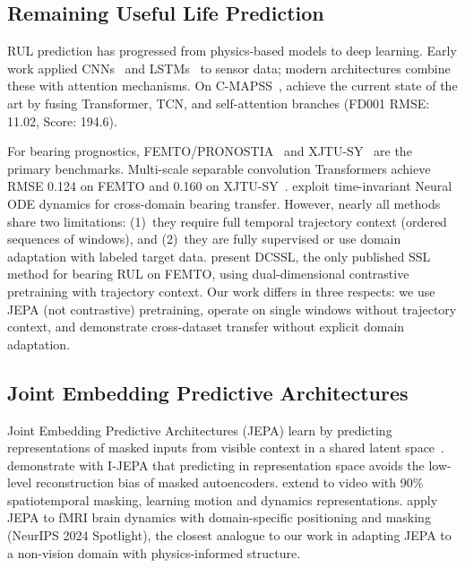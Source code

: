 \subsection{Remaining Useful Life Prediction}
\label{sec:related_rul}

RUL prediction has progressed from physics-based models to deep learning. Early work applied CNNs~\citep{li2018dcnn} and LSTMs~\citep{zheng2017lstm} to sensor data; modern architectures combine these with attention mechanisms. On C-MAPSS~\citep{saxena2008cmapss}, \citet{ttsnet2025} achieve the current state of the art by fusing Transformer, TCN, and self-attention branches (FD001 RMSE: 11.02, Score: 194.6).

For bearing prognostics, FEMTO/PRONOSTIA~\citep{nectoux2012pronostia} and XJTU-SY~\citep{wang2018xjtusybearing} are the primary benchmarks. Multi-scale separable convolution Transformers achieve RMSE 0.124 on FEMTO and 0.160 on XJTU-SY~\citep{mdsct2024}. \citet{nomi2024} exploit time-invariant Neural ODE dynamics for cross-domain bearing transfer. However, nearly all methods share two limitations: (1)~they require full temporal trajectory context (ordered sequences of windows), and (2)~they are fully supervised or use domain adaptation with labeled target data. \citet{shen2026dcssl} present DCSSL, the only published SSL method for bearing RUL on FEMTO, using dual-dimensional contrastive pretraining with trajectory context. Our work differs in three respects: we use JEPA (not contrastive) pretraining, operate on single windows without trajectory context, and demonstrate cross-dataset transfer without explicit domain adaptation.

\subsection{Joint Embedding Predictive Architectures}
\label{sec:related_jepa}

Joint Embedding Predictive Architectures (JEPA) learn by predicting representations of masked inputs from visible context in a shared latent space~\citep{lecun2022path}. \citet{assran2023ijepa} demonstrate with I-JEPA that predicting in representation space avoids the low-level reconstruction bias of masked autoencoders. \citet{bardes2024vjepa} extend to video with 90\% spatiotemporal masking, learning motion and dynamics representations. \citet{wang2024brainjepa} apply JEPA to fMRI brain dynamics with domain-specific positioning and masking (NeurIPS 2024 Spotlight), the closest analogue to our work in adapting JEPA to a non-vision domain with physics-informed structure.

